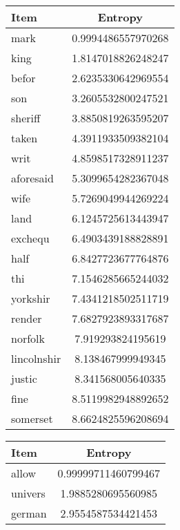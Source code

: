 \begin{table}
    \begin{minipage}{.5\textwidth}
        \small
        \centering
    	\begin{tabular}{l S[round-precision=4]}
    		\toprule
    		{Item} & {Entropy}\\
    		\midrule
    		mark & 0.9994486557970268\\
    		king & 1.8147018826248247\\
    		befor & 2.6235330642969554\\
    		son & 3.2605532800247521\\
    		sheriff & 3.8850819263595207\\
    		taken & 4.3911933509382104\\
    		writ & 4.8598517328911237\\
    		aforesaid & 5.3099654282367048\\
    		wife & 5.7269049944269224\\
    		land & 6.1245725613443947\\
    		exchequ & 6.4903439188828891\\
    		half & 6.8427723677764876\\
    		thi & 7.1546285665244032\\
    		yorkshir & 7.4341218502511719\\
    		render & 7.6827923893317687\\
    		norfolk & 7.919293824195619\\
    		lincolnshir & 8.138467999949345\\
    		justic & 8.341568005640335\\
    		fine & 8.5119982948892652\\
    		somerset & 8.6624825596208694\\
    		\bottomrule
    	\end{tabular}
    	\label{t:miki_finerolls}
    \end{minipage}
    \begin{minipage}{.5\textwidth}
        \small
        \centering
    	\begin{tabular}{l S[round-precision=4]}
    		\toprule
    		{Item} & {Entropy}\\
    		\midrule
    		allow & 0.99999711460799467\\
    		univers & 1.9885280695560985\\
    		german & 2.9554587534421453\\

\end{tabular}
\end{minipage}
\end{table}
